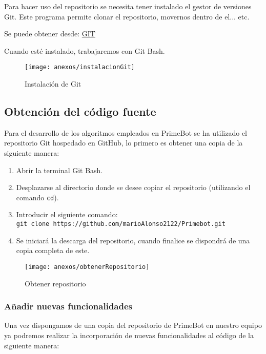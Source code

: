 Para hacer uso del repositorio se necesita tener instalado el gestor de versiones Git. Este programa permite clonar el repositorio, movernos dentro de el... etc.

Se puede obtener desde: \href{https://www.git-scm.com/downloads}{GIT}

Cuando esté instalado, trabajaremos con Git Bash.

\begin{figure}[h]
	\centering
	\texttt{[image: anexos/instalacionGit]}
	\caption{Instalación de Git}
	\label{fig:D.3}
\end{figure}

\subsection{Obtención del código fuente}\label{obtencion-del-codigo-fuente}

Para el desarrollo de los algoritmos empleados en PrimeBot se ha utilizado el repositorio Git hospedado en GitHub, lo primero es obtener una copia de la siguiente manera:
\begin{enumerate}
\def\labelenumi{\arabic{enumi}.}
\tightlist

\item
  Abrir la terminal Git Bash.
\item
  Desplazarse al directorio donde se desee copiar el repositorio
  (utilizando el comando \texttt{cd}).
  
  \item
  Introducir el siguiente comando:\\
  \texttt{git\ clone\ https://github.com/marioAlonso2122/Primebot.git}
  \item
  Se iniciará la descarga del repositorio, cuando finalice se dispondrá
  de una copia completa de este.
\end{enumerate}

\begin{figure}[h]
	\centering
	\texttt{[image: anexos/obtenerRepositorio]}
	\caption{Obtener repositorio}
	\label{fig:D.4}
\end{figure}

\subsubsection{Añadir nuevas funcionalidades}\label{nuevas-funcionalidades}

Una vez dispongamos de una copia del repositorio de PrimeBot en nuestro equipo ya podremos realizar la incorporación de nuevas funcionalidades al código de la siguiente manera:

